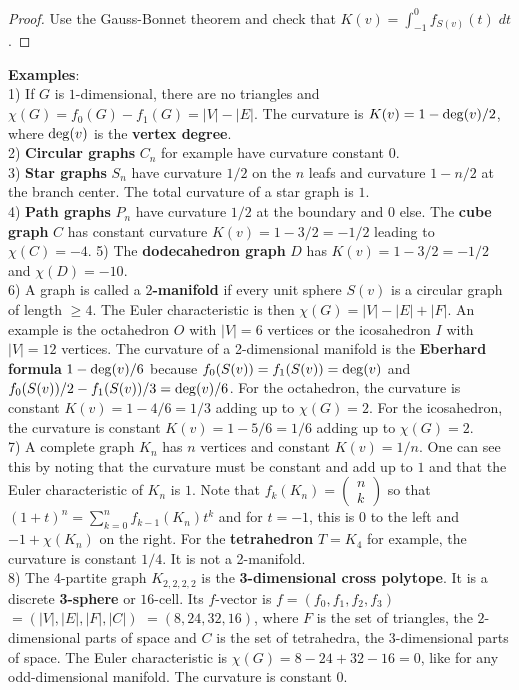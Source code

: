 \documentclass[12pt]{amsart}
\def\satz#1{ \vspace{1mm} \begin{center} \fcolorbox{black}{brightyellow}{ \parbox{15.2cm}{{\bf Theorem:} #1}} \vspace{1mm} \end{center} }
\begin{document}
\satz{ $f_G'(t) = \sum_{v \in V} f_{S(v)}(t)$.  }

\begin{proof}
Use the Gauss-Bonnet theorem and check that
$K(v) = \int_{-1}^0 f_{S(v)}(t) \; dt$. 
\end{proof}

{\bf Examples}:  \\

1) If $G$ is $1$-dimensional, there are no triangles 
and $\chi(G)=f_0(G)-f_1(G)=|V|-|E|$. The curvature is $K(v) = 1-{\rm deg}(v)/2$,
where ${\rm deg}(v)$ is the {\bf vertex degree}.  \\
2) {\bf Circular graphs} $C_n$ for example have curvature constant $0$.  \\
3) {\bf Star graphs} $S_n$ have curvature $1/2$ on the $n$ leafs and curvature $1-n/2$ 
at the branch center. The total curvature of a star graph is $1$.  \\
4) {\bf Path graphs} $P_n$ have curvature $1/2$ at the boundary and $0$ else. 
The {\bf cube graph} $C$ has constant curvature $K(v) = 1-3/2=-1/2$ leading to $\chi(C)=-4$.
5) The {\bf dodecahedron graph} $D$ has $K(v)=1-3/2=-1/2$ and $\chi(D)=-10$.  \\
6) A graph is called a {\bf $2$-manifold}  if every 
unit sphere $S(v)$ is a circular graph of length $\geq 4$. The Euler characteristic is then 
$\chi(G) = |V|-|E|+|F|$. An example is the octahedron $O$ with $|V|=6$ vertices
or the icosahedron $I$ with $|V|=12$ vertices. The curvature of a 2-dimensional manifold is 
the {\bf Eberhard formula} $1-{\rm deg}(v)/6$ because
$f_0(S(v)) = f_1(S(v)) = {\rm deg}(v)$ and $f_0(S(v))/2 - f_1(S(v))/3={\rm deg}(v)/6$.  
For the octahedron, the curvature is constant $K(v)=1-4/6=1/3$ adding up to $\chi(G)=2$.
For the icosahedron, the curvature is constant $K(v)=1-5/6=1/6$ adding up to $\chi(G)=2$.  \\
7) A complete graph $K_n$ has $n$ vertices and constant $K(v)=1/n$. 
One can see this by noting that the curvature must be constant and add up to $1$
and that the Euler characteristic of $K_n$ is $1$. Note that 
$f_k(K_n)=\left( \begin{array}{c} n \\ k \end{array} \right)$
so that $(1+t)^n = \sum_{k=0}^n f_{k-1}(K_n) t^k$ and
for $t=-1$, this is $0$ to the left and $-1+\chi(K_n)$ on the right. 
For the {\bf tetrahedron} $T=K_4$ for example, the curvature is constant $1/4$. It is not a
2-manifold.   \\
8) The 4-partite graph $K_{2,2,2,2}$ is the {\bf 3-dimensional cross polytope}. It is a
discrete {\bf 3-sphere} or $16$-cell. Its $f$-vector is $f=(f_0,f_1,f_2,f_3)$ $=(|V|,|E|,|F|,|C|)$ 
$=(8,24,32,16)$, where $F$ is the set of triangles, the $2$-dimensional parts of space and 
$C$ is the set of tetrahedra, the $3$-dimensional parts of space. The Euler characteristic is
$\chi(G)=8-24+32-16=0$, like for any odd-dimensional manifold. The curvature is constant $0$.
\end{document}
